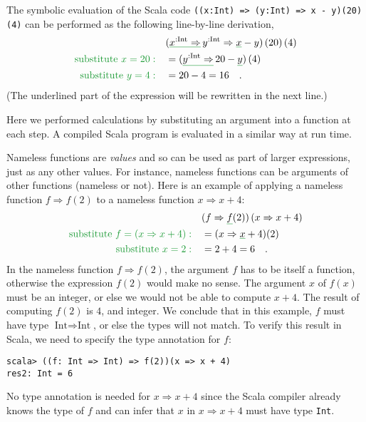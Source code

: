 The symbolic evaluation of the Scala code \lstinline!((x:Int) => (y:Int) => x - y)(20)(4)!
can be performed as the following line-by-line derivation,
\begin{align*}
 & (\gunderline{x^{:\text{Int}}\Rightarrow}\,y^{:\text{Int}}\Rightarrow\gunderline x-y)\left(20\right)\left(4\right)\\
{\color{greenunder}\text{substitute }x=20:}\quad & =(\gunderline{y^{:\text{Int}}\Rightarrow}\,20-\gunderline y)\left(4\right)\\
{\color{greenunder}\text{substitute }y=4:}\quad & =20-4=16\quad.
\end{align*}
(The underlined part of the expression will be rewritten in the next
line.)

Here we performed calculations by substituting an argument into a
function at each step. A compiled Scala program is evaluated in a
similar way at run time.

Nameless functions are \emph{values} and so can be used as part of
larger expressions, just as any other values. For instance, nameless
functions can be arguments of other functions (nameless or not). Here
is an example of applying a nameless function $f\Rightarrow f(2)$
to a nameless function $x\Rightarrow x+4$:
\begin{align*}
 & (f\Rightarrow\gunderline f(2))\left(x\Rightarrow x+4\right)\\
{\color{greenunder}\text{substitute }f=\left(x\Rightarrow x+4\right):}\quad & =(x\Rightarrow\gunderline x+4)(2)\\
{\color{greenunder}\text{substitute }x=2:}\quad & =2+4=6\quad.
\end{align*}
In the nameless function $f\Rightarrow f(2)$, the argument $f$ has
to be itself a function, otherwise the expression $f(2)$ would make
no sense. The argument $x$ of $f(x)$ must be an integer, or else
we would not be able to compute $x+4$. The result of computing $f(2)$
is $4$, and integer. We conclude that in this example, $f$ must
have type $\text{Int}\Rightarrow\text{Int}$, or else the types will
not match. To verify this result in Scala, we need to specify the
type annotation for $f$:
\begin{lstlisting}
scala> ((f: Int => Int) => f(2))(x => x + 4)
res2: Int = 6  
\end{lstlisting}
No type annotation is needed for $x\Rightarrow x+4$ since the Scala
compiler already knows the type of $f$ and can infer that $x$ in
$x\Rightarrow x+4$ must have type \lstinline!Int!.

